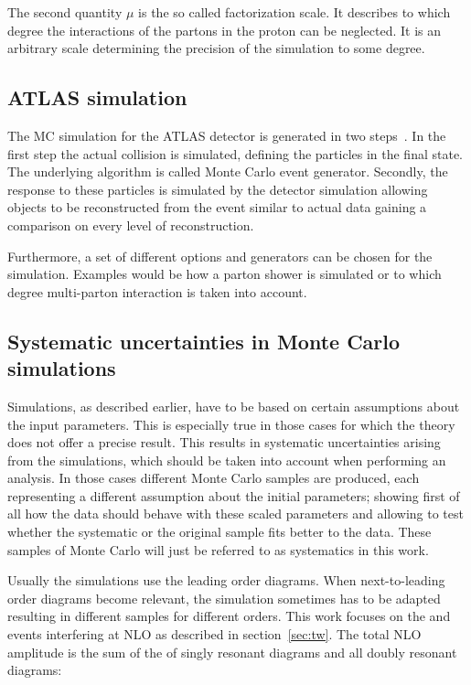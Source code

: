 The second quantity $\mu$ is the so called factorization scale. It describes to which degree the interactions of the partons in the proton can be neglected. It is an arbitrary scale determining the precision of the simulation to some degree.

\subsection{ATLAS simulation}

The MC simulation for the ATLAS detector is generated in two steps~\cite{atlasmontecarlo}.
In the first step the actual collision is simulated, defining the particles in the final state. The underlying algorithm is called Monte Carlo event generator.
Secondly, the response to these particles is simulated by the detector simulation allowing objects to be reconstructed from the event similar to actual data gaining a comparison on every level of reconstruction.

Furthermore, a set of different options and generators can be chosen for the simulation. Examples would be how a parton shower is simulated or to which degree multi-parton interaction is taken into account.

\subsection{Systematic uncertainties in Monte Carlo simulations}
\label{sec:systmc}

Simulations, as described earlier, have to be based on certain assumptions about the input parameters. This is especially true in those cases for which the theory does not offer a precise result. This results in systematic uncertainties arising from the simulations, which should be taken into account when performing an analysis.
In those cases different Monte Carlo samples are produced, each representing a different assumption about the initial parameters; showing first of all how the data should behave with these scaled parameters and allowing to test whether the systematic or the original sample fits better to the data. 
These samples of Monte Carlo will just be referred to as systematics in this work.

Usually the simulations use the leading order diagrams.
When next-to-leading order diagrams become relevant, the simulation sometimes has to be adapted resulting in different samples for different orders.
This work focuses on the \tW and \ttbar events interfering at NLO as described in section~\ref{sec:tw}.
The total NLO amplitude is the sum of the of singly resonant diagrams and all doubly resonant diagrams:

